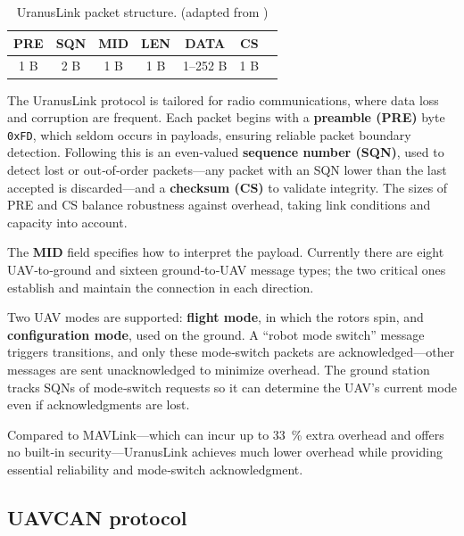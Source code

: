 \begin{table}[h]
\centering
\begin{tabular}{|c|c|c|c|c|c|c|}
\hline
\textbf{PRE} & \textbf{SQN} & \textbf{MID} & \textbf{LEN} & \textbf{DATA} & \textbf{CS} \\
\hline
1 B & 2 B & 1 B & 1 B & 1–252 B & 1 B \\
\hline
\end{tabular}
\caption{UranusLink packet structure. (adapted from \cite{kriz2015uranuslink})}
\label{tab:uranuslink_pivoted}
\end{table}

The UranusLink protocol is tailored for radio communications, where data loss and corruption are frequent.  Each packet begins with a \textbf{preamble (PRE)} byte \texttt{0xFD}, which seldom occurs in payloads, ensuring reliable packet boundary detection.  Following this is an even-valued \textbf{sequence number (SQN)}, used to detect lost or out‑of‑order packets—any packet with an SQN lower than the last accepted is discarded—and a \textbf{checksum (CS)} to validate integrity.  The sizes of PRE and CS balance robustness against overhead, taking link conditions and capacity into account.

\vspace{0.5cm}

The \textbf{MID} field specifies how to interpret the payload.  Currently there are eight UAV‑to‑ground and sixteen ground‑to‑UAV message types; the two critical ones establish and maintain the connection in each direction.  

\vspace{0.5cm}

Two UAV modes are supported: \textbf{flight mode}, in which the rotors spin, and \textbf{configuration mode}, used on the ground.  A “robot mode switch” message triggers transitions, and only these mode‑switch packets are acknowledged—other messages are sent unacknowledged to minimize overhead.  The ground station tracks SQNs of mode‑switch requests so it can determine the UAV’s current mode even if acknowledgments are lost.

\vspace{0.5cm}

Compared to MAVLink—which can incur up to 33 \% extra overhead and offers no built‑in security—UranusLink achieves much lower overhead while providing essential reliability and mode‑switch acknowledgment.



\subsection{UAVCAN protocol}

